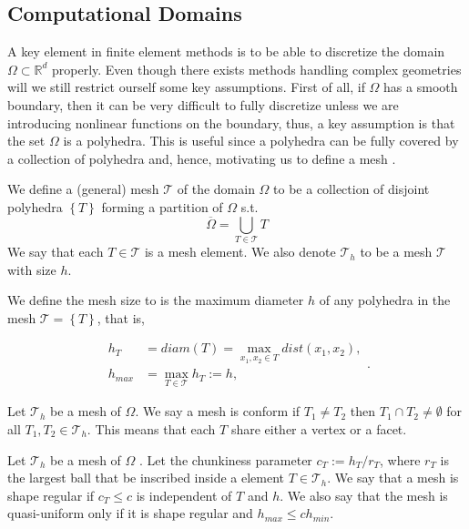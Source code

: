 \subsection{Computational Domains}%
\label{sub:computational_domain}
A key element in finite element methods is to be able to discretize the domain $\Omega \subset \mathbb{R} ^{d} $ properly. Even though there exists methods handling complex geometries will we still restrict ourself some key assumptions. First of all,
if $\Omega $ has a smooth boundary, then it can be very difficult to fully discretize unless we are introducing nonlinear functions on the boundary, thus, a key assumption is that the set $\Omega $ is a polyhedra. This is useful since a polyhedra can
be fully covered by a collection of polyhedra and, hence, motivating us to define a mesh \cite[Assumption 1.7]{pietro2012}.

\begin{definition}[Mesh]
    We define a (general) mesh $\mathcal{T} $ of the domain $\Omega $ to be a collection of disjoint polyhedra $\left\{ T \right\}  $ forming a partition of $\Omega $ s.t.\[
    \overline{\Omega } = \bigcup _{T \in \mathcal{T} } T
    \]
    We say that each $T \in  \mathcal{T} $ is a mesh element. We also denote $\mathcal{T} _{h}$ to be a mesh $\mathcal{T} $ with size $h$.
\end{definition}

\begin{definition}
We define the mesh size to is the maximum diameter $h $ of any polyhedra in the mesh $\mathcal{T} = \left\{ T \right\}  $, that is,

\begin{equation}
\begin{split}
    h _{T} & = diam\left( T \right)   = \max_{x_1, x_{2} \in T} dist(x_{1}, x_{2}),  \\
    h_{max} &= \max_{T \in \mathcal{T} }  h_{T} := h,
\end{split}
.\end{equation}
\end{definition}

\begin{definition}
Let $\mathcal{T}_{h} $ be a mesh of $\Omega $. We say a mesh is conform if $T_{1} \neq T_{2 }$  then $T_{1} \cap T_{2} \neq \emptyset  $ for all $T_{1}, T_{2} \in \mathcal{T}_{h}$. This means that each $T$ share either a vertex or a facet.
\end{definition}

\begin{definition}
Let $\mathcal{T}_{h} $ be a mesh of $\Omega $ .
Let the chunkiness parameter $c_{T} := h_{T}/r_{T}$, where $r_{T}$  is the largest ball that be inscribed inside a element $T \in \mathcal{T}_{h} $.
We say that a mesh is shape regular if $c_{T}\le  c$ is independent of $T$  and $h$. We also say that the mesh is quasi-uniform only if it is shape regular and $h_{max} \le  c h_{min}$.
\end{definition}

